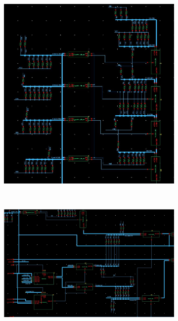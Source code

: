 \documentclass[letterpaper, 11pt]{article}
\begin{document}
	
	\begin{figure}[ht!]
		\centering
		\begin{subfigure}[b]{.411\linewidth}
			\includegraphics[width=\textwidth]{report_pics/datapath_top.jpg}   
			\caption{}
			\label{fig26a}
		\end{subfigure}
		\\
		\begin{subfigure}[b]{.4\linewidth}
			\includegraphics[width=\textwidth]{report_pics/datapath_btm_left.jpg}
			\caption{}
			\label{fig26b}

\end{subfigure}
\end{figure}
\end{document}
